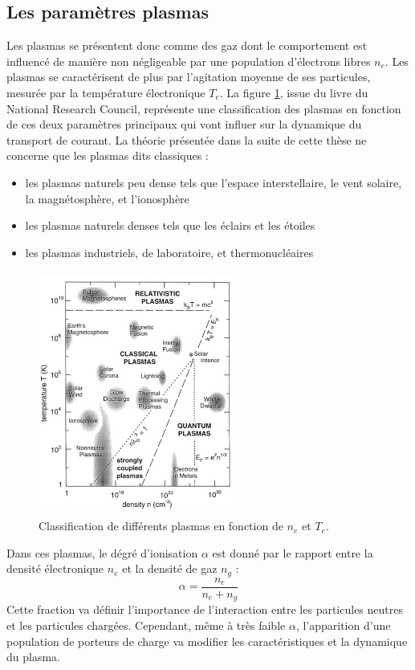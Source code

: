 \subsection{Les paramètres plasmas}
Les plasmas se présentent donc comme des gaz dont le comportement est influencé
de manière non négligeable par une population d'électrons libres $n_e$.
Les plasmas se caractérisent de plus par l'agitation moyenne de ses particules,
mesurée par la température électronique $T_e$.
La figure \ref{zoologie}, issue du livre du National Research
Council\cite{national1995Plasma}, représente une classification des plasmas en
fonction de ces deux paramètres principaux qui vont influer sur la dynamique du
transport de courant.
La théorie présentée dans la suite de cette thèse ne concerne que les plasmas
dits classiques :
\begin{itemize}
  \item les plasmas naturels peu dense tels que l'espace interstellaire,
  le vent solaire, la magnétosphère, et l'ionosphère
  \item les plasmas naturels denses tels que les éclairs et les étoiles
  \item les plasmas industriels, de laboratoire, et thermonucléaires
\end{itemize}
\begin{figure}[htbp]
\centering
\includegraphics[height=80mm,width=64mm]{figures/zoologie.png}{\caption{Classification
de différents plasmas en fonction de $n_e$ et $T_e$.}\label{zoologie}}
\end{figure}

Dans ces plasmas, le dégré d'ionisation $\alpha$ est donné par le rapport
entre la densité électronique $n_e$ et la densité de gaz $n_g$ :
\begin{equation}
\alpha=\frac{n_e}{n_e+n_g}
\end{equation}
Cette fraction va définir l'importance de l'interaction entre les particules
neutres et les particules chargées. Cependant, même à très faible $\alpha$,
l'apparition d'une population de porteurs de charge va modifier les caractéristiques et la
dynamique du plasma.

